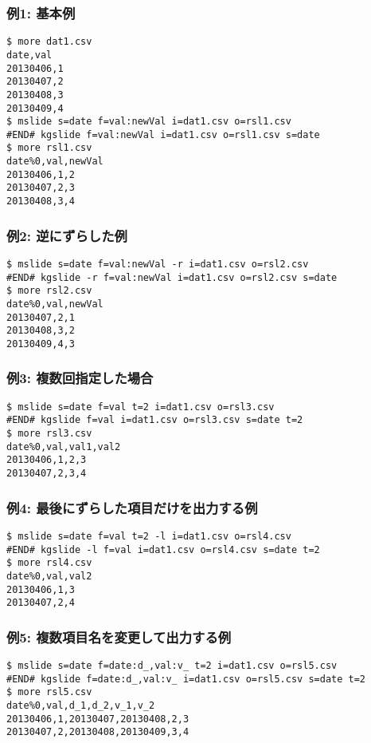 \subsubsection*{例1: 基本例}



\begin{Verbatim}[baselinestretch=0.7,frame=single]
$ more dat1.csv
date,val
20130406,1
20130407,2
20130408,3
20130409,4
$ mslide s=date f=val:newVal i=dat1.csv o=rsl1.csv
#END# kgslide f=val:newVal i=dat1.csv o=rsl1.csv s=date
$ more rsl1.csv
date%0,val,newVal
20130406,1,2
20130407,2,3
20130408,3,4
\end{Verbatim}
\subsubsection*{例2: 逆にずらした例}



\begin{Verbatim}[baselinestretch=0.7,frame=single]
$ mslide s=date f=val:newVal -r i=dat1.csv o=rsl2.csv
#END# kgslide -r f=val:newVal i=dat1.csv o=rsl2.csv s=date
$ more rsl2.csv
date%0,val,newVal
20130407,2,1
20130408,3,2
20130409,4,3
\end{Verbatim}
\subsubsection*{例3: 複数回指定した場合}



\begin{Verbatim}[baselinestretch=0.7,frame=single]
$ mslide s=date f=val t=2 i=dat1.csv o=rsl3.csv
#END# kgslide f=val i=dat1.csv o=rsl3.csv s=date t=2
$ more rsl3.csv
date%0,val,val1,val2
20130406,1,2,3
20130407,2,3,4
\end{Verbatim}
\subsubsection*{例4: 最後にずらした項目だけを出力する例}



\begin{Verbatim}[baselinestretch=0.7,frame=single]
$ mslide s=date f=val t=2 -l i=dat1.csv o=rsl4.csv
#END# kgslide -l f=val i=dat1.csv o=rsl4.csv s=date t=2
$ more rsl4.csv
date%0,val,val2
20130406,1,3
20130407,2,4
\end{Verbatim}
\subsubsection*{例5: 複数項目名を変更して出力する例}



\begin{Verbatim}[baselinestretch=0.7,frame=single]
$ mslide s=date f=date:d_,val:v_ t=2 i=dat1.csv o=rsl5.csv
#END# kgslide f=date:d_,val:v_ i=dat1.csv o=rsl5.csv s=date t=2
$ more rsl5.csv
date%0,val,d_1,d_2,v_1,v_2
20130406,1,20130407,20130408,2,3
20130407,2,20130408,20130409,3,4
\end{Verbatim}
